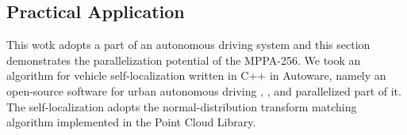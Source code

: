 \documentclass[conference,compsoc]{IEEEtran}
\begin{document}

\vspace{-3mm}
\subsection{Practical Application}
\label{sec:practical_application}
\vspace{-3mm}
This wotk adopts a part of an autonomous driving system and this section demonstrates the parallelization potential of the MPPA-256.
We took an algorithm for vehicle self-localization written in C++ in Autoware, namely an open-source software for urban autonomous driving \cite{autoware}, \cite{kato2015open}, and parallelized part of it.
The self-localization adopts the normal-distribution transform matching algorithm \cite{magnusson2009three} implemented in the Point Cloud Library.

\end{document}
